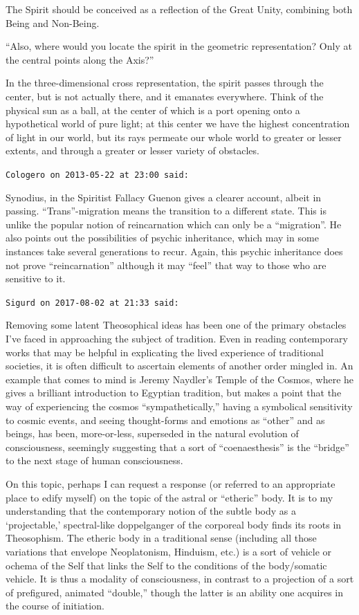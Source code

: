 \begin{footnotesize}
\begin{sffamily}
The Spirit should be conceived as a reflection of the Great Unity, combining both Being and Non-Being.

``Also, where would you locate the spirit in the geometric representation? Only at the central points along the Axis?''

In the three-dimensional cross representation, the spirit passes through the center, but is not actually there, and it emanates everywhere. Think of the physical sun as a ball, at the center of which is a port opening onto a hypothetical world of pure light; at this center we have the highest concentration of light in our world, but its rays permeate our whole world to greater or lesser extents, and through a greater or lesser variety of obstacles.

\hfill

\texttt{Cologero on 2013-05-22 at 23:00 said:}

Synodius, in the Spiritist Fallacy Guenon gives a clearer account, albeit in passing. ``Trans''-migration means the transition to a different state. This is unlike the popular notion of reincarnation which can only be a ``migration''. He also points out the possibilities of psychic inheritance, which may in some instances take several generations to recur. Again, this psychic inheritance does not prove ``reincarnation'' although it may ``feel'' that way to those who are sensitive to it.

\hfill

\texttt{Sigurd on 2017-08-02 at 21:33 said:}

Removing some latent Theosophical ideas has been one of the primary obstacles I've faced in approaching the subject of tradition. Even in reading contemporary works that may be helpful in explicating the lived experience of traditional societies, it is often difficult to ascertain elements of another order mingled in. An example that comes to mind is Jeremy Naydler's Temple of the Cosmos, where he gives a brilliant introduction to Egyptian tradition, but makes a point that the way of experiencing the cosmos ``sympathetically,'' having a symbolical sensitivity to cosmic events, and seeing thought-forms and emotions as ``other'' and as beings, has been, more-or-less, superseded in the natural evolution of consciousness, seemingly suggesting that a sort of ``coenaesthesis'' is the ``bridge'' to the next stage of human consciousness.

On this topic, perhaps I can request a response (or referred to an appropriate place to edify myself) on the topic of the astral or ``etheric'' body. It is to my understanding that the contemporary notion of the subtle body as a `projectable,' spectral-like doppelganger of the corporeal body finds its roots in Theosophism. The etheric body in a traditional sense (including all those variations that envelope Neoplatonism, Hinduism, etc.) is a sort of vehicle or ochema of the Self that links the Self to the conditions of the body/somatic vehicle. It is thus a modality of consciousness, in contrast to a projection of a sort of prefigured, animated ``double,'' though the latter is an ability one acquires in the course of initiation.


\end{sffamily}
\end{footnotesize}
